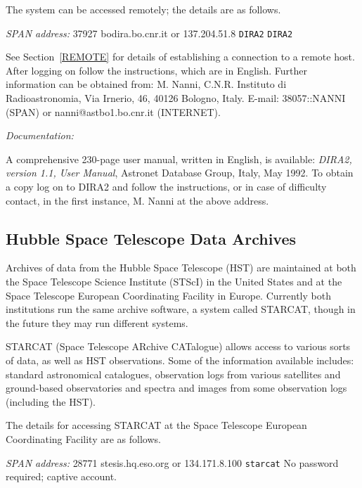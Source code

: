 \documentclass[twoside,11pt]{article}
\newcommand{\xlabel}[1]{}
\begin{document}
The system can be accessed remotely; the details are as follows.

{\it SPAN address: } 37927
 bodira.bo.cnr.it or 137.204.51.8
 \verb-DIRA2-
 \verb-DIRA2-

See Section~\ref{REMOTE} for details of establishing a connection to
a remote host. After logging on follow the instructions, which are in 
English. Further information can be obtained from: M. Nanni, C.N.R. 
Instituto di Radioastronomia, Via Irnerio, 46, 40126 Bologno, Italy. 
E-mail: 38057::NANNI (SPAN) or nanni@astbo1.bo.cnr.it (INTERNET).

{\it Documentation:}

A comprehensive 230-page user manual, written in English, is available:
{\it DIRA2, version 1.1, User Manual}, Astronet Database Group, Italy,
May 1992. To obtain a copy log on to DIRA2 and follow the instructions,
or in case of difficulty contact, in the first instance, M. Nanni at
the above address.

\subsection{Hubble Space Telescope Data Archives
\xlabel{hubble_space_telescope_data_archives}}

Archives of data from the Hubble Space Telescope (HST) are maintained at
both the Space Telescope Science Institute (STScI) in the United States
and at the Space Telescope European Coordinating Facility in Europe. 
Currently both institutions run the same archive software, a system 
called STARCAT, though in the future they may run different systems.

STARCAT (Space Telescope ARchive CATalogue) allows access to various
sorts of data, as well as HST observations. Some of the information
available includes: standard astronomical catalogues, observation logs
from various satellites and ground-based observatories and spectra
and images from some observation logs (including the HST).

The details for accessing STARCAT at the Space Telescope European 
Coordinating Facility are as follows.

{\it SPAN address: } 28771
 stesis.hq.eso.org or 134.171.8.100
 \verb-starcat-
 No password required; captive account.
\end{document}
